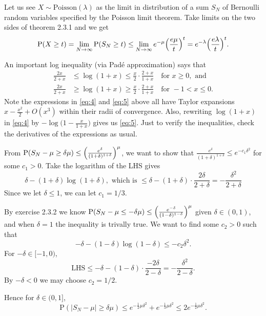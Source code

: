\documentclass[11pt]{article}
\newcommand{\abs}[1]{\lvert #1 \rvert}
\renewcommand{\Pr}{\mathrm{P}}
\theoremstyle{plain}
\theoremstyle{definition}
\theoremstyle{remark}
\theoremstyle{definition}
\newenvironment{mansol}[1]{%
  \renewcommand\themansolinner{#1}%
  \mansolinner
}{\endmansolinner}
\begin{document}
\begin{mansol}{2.3.3}
Let us see $X \sim \text{Poisson}(\lambda)$ as the limit in distribution of a sum $S_N$ of Bernoulli random variables specified by the Poisson limit theorem. Take limits on the two sides of theorem 2.3.1 and we get \[\Pr(X \geq t) = \lim_{N\to \infty} \Pr(S_N \geq t) \leq \lim_{N\to \infty} e^{-\mu} \Bigl(\frac{e\mu}{t}\Bigr)^t = e^{-\lambda}\Bigl(\frac{e\lambda}{t}\Bigr)^t.\]
\end{mansol}

\begin{mansol}{2.3.5}
    An important log inequality (via Padé approximation) says that 
    \begin{align}
        \frac{2x}{2+x} & \leq \log(1+x) \leq \frac{x}{2}\cdot\frac{2+x}{1+x}\quad \text{for }x\geq 0,\text{ and} \label{eq:4}\\
        \frac{2x}{2+x} & \geq \log(1+x) \geq \frac{x}{2}\cdot\frac{2+x}{1+x}\quad \text{for }-1 < x\leq 0. \label{eq:5}
    \end{align}
    Note the expressions in \eqref{eq:4} and \eqref{eq:5} above all have Taylor expansions $x - \frac{x^2}{2} + O(x^3)$ within their radii of convergence. Also, rewriting $\log(1+x)$ in \eqref{eq:4} by $-\log\bigl(1 - \frac{x}{1+x}\bigr)$ gives us \eqref{eq:5}. Just to verify the inequalities, check the derivatives of the expressions as usual.

    From $\Pr(S_N - \mu \geq \delta \mu) \leq \Bigl(\frac{e^\delta}{(1+\delta)^{1+\delta}}\Bigr)^\mu$, we want to show that $\frac{e^\delta}{(1+\delta)^{1+\delta}} \leq e^{-c_1\delta^2}$ for some $c_1 > 0$. Take the logarithm of the LHS gives \[
    \delta - (1+\delta)\log(1+\delta), \text{ which is } \leq \delta - (1+\delta)\cdot\frac{2\delta}{2+\delta} = -\frac{\delta^2}{2+\delta}
    \]
    Since we let $\delta \leq 1$, we can let $c_1 = 1/3$.

    By exercise 2.3.2 we know $\Pr(S_N - \mu \leq -\delta \mu) \leq \Bigl(\frac{e^{-\delta}}{(1-\delta)^{1-\delta}}\Bigr)^\mu$ given $\delta \in (0,1)$, and when $\delta = 1$ the inequality is trivally true. We want to find some $c_2 > 0$ such that \[
    -\delta - (1-\delta)\log(1-\delta) \leq -c_2 \delta^2.
    \]
    For $-\delta \in [-1,0)$, \[
    \text{LHS} \leq -\delta - (1 -\delta)\cdot \frac{-2\delta}{2-\delta} = -\frac{\delta^2}{2-\delta}.
    \]
    By $-\delta < 0$ we may choose $c_2 = 1/2$. 

    Hence for $\delta \in (0,1]$, \[
    \Pr(\abs{S_N - \mu} \geq \delta \mu) \leq e^{-\frac{1}{2}\mu \delta^2} + e^{-\frac{1}{3}\mu \delta^2} \leq 2 e^{-\frac{1}{2}\mu \delta^2}.
    \]
\end{mansol}
\end{document}
